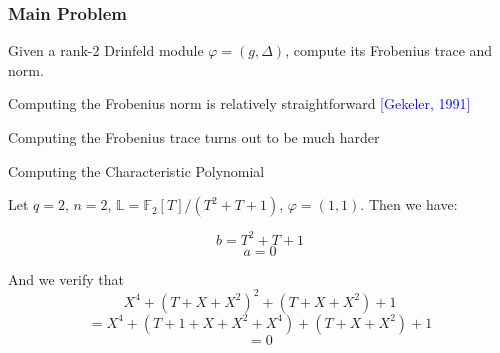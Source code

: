 \documentclass{beamer}
\newcommand{\f}{\mathbb{F}}
\newcommand{\blue}{\textcolor{blue}}
\newcommand{\spa}{\vspace{0.2cm}}
\begin{document}

\begin{frame}
\frametitle{Main Problem}

\begin{problem}
Given a rank-2 Drinfeld module $\varphi = (g,\Delta)$, compute its Frobenius trace and norm.
\end{problem}

\spa

 Computing the Frobenius norm is relatively straightforward \blue{[Gekeler, 1991]}
 
 \spa
 
 Computing the Frobenius trace turns out to be much harder

\end{frame}

\begin{frame}{Computing the Characteristic Polynomial}
\begin{example}
Let $q = 2$, $n = 2$, $\mathbb{L} = \mathbb{F}_2[T]/(T^2 + T + 1)$, $\varphi = (1,1)$. Then we have:

\[ b = T^2 + T +1\]
\[ a = 0\]

And we verify that
\[ X^{4} + (T + X +X^2)^2 + (T + X +X^2) + 1\]
\[ = X^{4} + (T +1 + X + X^2 + X^4) + (T + X +X^2) + 1\]
\[ = 0\]




\end{example}
\end{frame}









\end{document}
